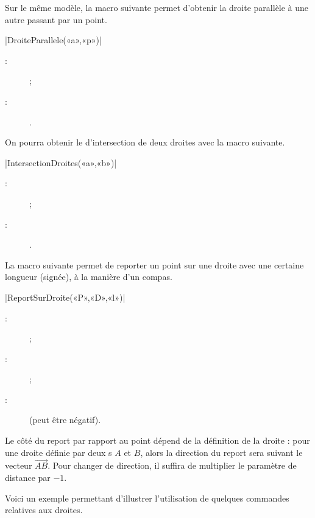 \documentclass[a4paper,french]{article}
\begin{document}
Sur le même modèle, la macro suivante permet d'obtenir la droite parallèle à une autre passant
par un point.
\begin{colourband}
\macro|DroiteParallele(«a»,«p»)|
\begin{description}
  \item[:]   ;
  \item[:] .
\end{description}
\end{colourband}

On pourra obtenir le  d'intersection de deux droites avec la
macro suivante.
\begin{colourband}
\macro|IntersectionDroites(«a»,«b»)|
\begin{description}
  \item[:]   ;
  \item[:] .
\end{description}
\end{colourband}

La macro suivante permet de reporter un point sur une droite avec une certaine
longueur (signée), à la manière d'un compas. 

\begin{colourband}
\macro|ReportSurDroite(«P»,«D»,«l»)|
\begin{description}
  \item[:]   ;
  \item[:]  ;
  \item[:]  (peut être négatif).
\end{description}
\end{colourband}

Le côté du report par rapport au point  dépend de la définition de 
la droite : pour une droite définie par deux s $A$ et $B$, alors
la direction du report sera suivant le vecteur $\overrightarrow{AB}$. Pour
changer de direction, il suffira de multiplier le paramètre de distance 
par $-1$. 

Voici un exemple permettant d'illustrer l'utilisation de quelques commandes
relatives aux droites.
\end{document}

